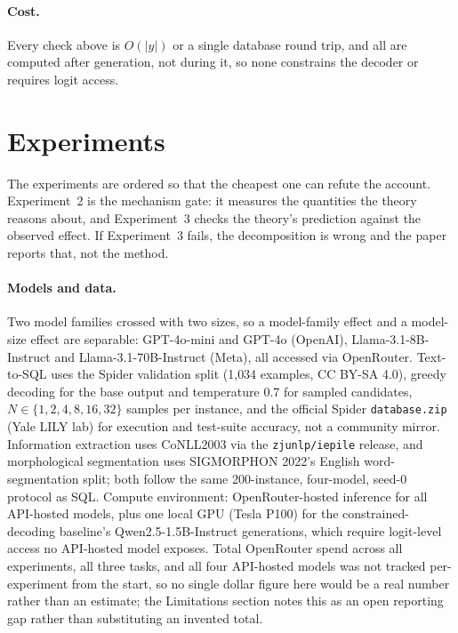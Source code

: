 \documentclass[11pt]{article}
\begin{document}
\paragraph{Cost.} Every check above is $O(|y|)$ or a single database round trip, and all are computed after generation, not during it, so none constrains the decoder or requires logit access.

\section{Experiments}\label{sec:exp}
The experiments are ordered so that the cheapest one can refute the account. Experiment~2 is the mechanism gate: it measures the quantities the theory reasons about, and Experiment~3 checks the theory's prediction against the observed effect. If Experiment~3 fails, the decomposition is wrong and the paper reports that, not the method.

\paragraph{Models and data.} Two model families crossed with two sizes, so a model-family effect and a model-size effect are separable: GPT-4o-mini and GPT-4o (OpenAI), Llama-3.1-8B-Instruct and Llama-3.1-70B-Instruct (Meta), all accessed via OpenRouter. Text-to-SQL uses the Spider validation split (1{,}034 examples, CC BY-SA 4.0), greedy decoding for the base output and temperature 0.7 for sampled candidates, $N\in\{1,2,4,8,16,32\}$ samples per instance, and the official Spider \texttt{database.zip} (Yale LILY lab) for execution and test-suite accuracy, not a community mirror. Information extraction uses CoNLL2003 via the \texttt{zjunlp/iepile} release, and morphological segmentation uses SIGMORPHON 2022's English word-segmentation split; both follow the same 200-instance, four-model, seed-0 protocol as SQL. Compute environment: OpenRouter-hosted inference for all API-hosted models, plus one local GPU (Tesla P100) for the constrained-decoding baseline's Qwen2.5-1.5B-Instruct generations, which require logit-level access no API-hosted model exposes. Total OpenRouter spend across all experiments, all three tasks, and all four API-hosted models was not tracked per-experiment from the start, so no single dollar figure here would be a real number rather than an estimate; the Limitations section notes this as an open reporting gap rather than substituting an invented total.
\end{document}
